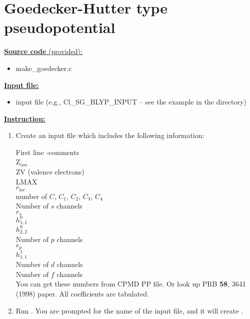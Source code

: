 \documentclass[letterpaper,12pt]{article}
\begin{document}
\section{Goedecker-Hutter type pseudopotential}

\noindent
\underline{ {\bf Source code }(provided): }
	\begin{itemize}
	\item make\_goedecker.c
	\end{itemize}

\vskip 12pt
\noindent
\underline{ {\bf Input file:} }
	\begin{itemize}
	\item input file (e.g., Cl\_SG\_BLYP\_INPUT -- see the example in the directory)
	\end{itemize}
	
	
\vskip 12pt
\noindent
\underline{ {\bf Instruction:} }

\begin{enumerate}
\item Create an input file which includes the following information:

First line -comments\\
Z$_{ion}$\\
ZV (valence electrons)\\
LMAX\\
$r_{loc}$\\
number of $C$, $C_1$, $C_2$, $C_3$, $C_4$\\
Number of $s$ channels\\
$r_s$\\
$h^0_{1,1}$\\
$h^0_{2,2}$\\
Number of $p$ channels\\
$r_p$\\
$h^1_{1,1}$\\
Number of $d$ channels\\
Number of $f$ channels\\

You can get these numbers from CPMD PP file. Or look up PRB \textbf{58}, 3641 (1998) paper. All coefficients are tabulated.

\item Run {\selectfont{make\_goedecker.c}}. You are prompted for the name of the input file, and it will create {\selectfont{PSEUDO.OUT}}.


\end{enumerate}







	
\end{document}
